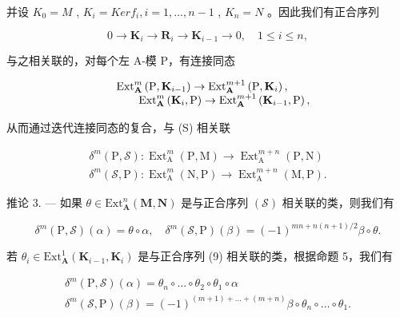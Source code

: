 并设 \(K_{0} = M\) , \(K_{i} = Ker f_{i}, i = 1, \ldots, n - 1\) , \(K_{n} = N\) 。因此我们有正合序列

\[
0 \to \mathbf {K} _ {i} \to \mathbf {R} _ {i} \to \mathbf {K} _ {i - 1} \to 0, \quad 1 \leqslant i \leqslant n,\tag{9}
\]

与之相关联的，对每个左 A-模 P，有连接同态

\[
\begin{array}{r l}&{\mathrm{Ext} _ {\mathbf {A}} ^ {m} \left(\mathrm{P}, \mathbf {K} _ {i - 1}\right)\rightarrow \mathrm{Ext} _ {\mathbf {A}} ^ {m + 1} \left(\mathrm{P}, \mathbf {K} _ {i}\right),}\\&{\qquad \mathrm{Ext} _ {\mathbf {A}} ^ {m} \left(\mathbf {K} _ {i}, \mathrm{P}\right)\rightarrow \mathrm{Ext} _ {\mathbf {A}} ^ {m + 1} \left(\mathbf {K} _ {i - 1}, \mathrm{P}\right),}\end{array}
\]

从而通过迭代连接同态的复合，与 (S) 相关联

\[
\begin{array}{l} \delta^ {m} (\mathrm{P}, \mathcal {S}): \operatorname{Ext} _ {\mathrm{A}} ^ {m} (\mathrm{P}, \mathrm{M}) \to \operatorname{Ext} _ {\mathrm{A}} ^ {m + n} (\mathrm{P}, \mathrm{N}) \\ \delta^ {m} (\mathcal {S}, \mathrm{P}): \operatorname{Ext} _ {\mathrm{A}} ^ {m} (\mathrm{N}, \mathrm{P}) \to \operatorname{Ext} _ {\mathrm{A}} ^ {m + n} (\mathrm{M}, \mathrm{P}). \end{array}
\]

推论 3. --- 如果 \(\theta\in\mathrm{Ext}_{\mathbf{A}}^{n}(\mathbf{M},\mathbf{N})\) 是与正合序列 \((\mathcal{S})\) 相关联的类，则我们有

\[
\delta^ {m} (\mathrm{P}, \mathscr {S}) (\alpha) = \theta \circ \alpha , \quad \delta^ {m} (\mathscr {S}, \mathrm{P}) (\beta) = (- 1) ^ {m n + n (n + 1) / 2} \beta \circ \theta .
\]

若 \(\theta_{i}\in\mathrm{Ext}_{\mathbf{A}}^{1}(\mathbf{K}_{i-1},\mathbf{K}_{i})\) 是与正合序列 (9) 相关联的类，根据命题 5，我们有

\[
\begin{array}{l} \delta^ {m} (\mathrm{P}, \mathcal {S}) (\alpha) = \theta_ {n} \circ \dots \circ \theta_ {2} \circ \theta_ {1} \circ \alpha \\ \delta^ {m} (\mathcal {S}, \mathrm{P}) (\beta) = (- 1) ^ {(m + 1) + \dots + (m + n)} \beta \circ \theta_ {n} \circ \dots \circ \theta_ {1}. \end{array}
\]

